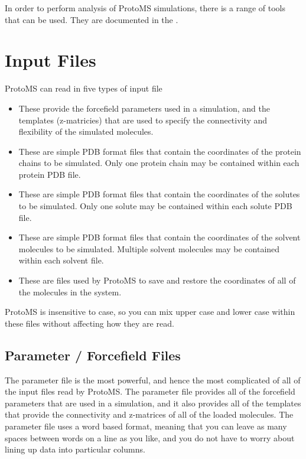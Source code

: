 \documentclass[letterpaper,10pt,english]{sphinxmanual}
\begin{document}
In order to perform analysis of ProtoMS simulations, there is a range of tools that can be used. They are documented in the .


\chapter{Input Files}
\label{\detokenize{protoms:input-files}}
ProtoMS can read in five types of input file
\begin{itemize}
\item {} 
 These provide the forcefield parameters used in a simulation, and the templates (z-matricies) that are used to specify the connectivity and flexibility of the simulated molecules.

\item {} 
 These are simple PDB format files that contain the coordinates of the protein chains to be simulated. Only one protein chain may be contained within each protein PDB file.

\item {} 
 These are simple PDB format files that contain the coordinates of the solutes to be simulated. Only one solute may be contained within each solute PDB file.

\item {} 
 These are simple PDB format files that contain the coordinates of the solvent molecules to be simulated. Multiple solvent molecules may be contained within each solvent file.

\item {} 
 These are files used by ProtoMS to save and restore the coordinates of all of the molecules in the system.

\end{itemize}

ProtoMS is insensitive to case, so you can mix upper case and lower case within these files without affecting how
they are read.


\section{Parameter / Forcefield Files}
\label{\detokenize{protoms:parfil}}\label{\detokenize{protoms:parameter-forcefield-files}}
The parameter file is the most powerful, and hence the most complicated of all of the input files read by ProtoMS. The parameter file provides all of the forcefield parameters that are used in a simulation, and it also provides all of the templates that provide the connectivity and z-matrices of all of the loaded molecules. The parameter file uses a word based format, meaning that you can leave as many spaces between words on a line as you like, and you do not have to worry about lining up data into particular columns.
\end{document}
